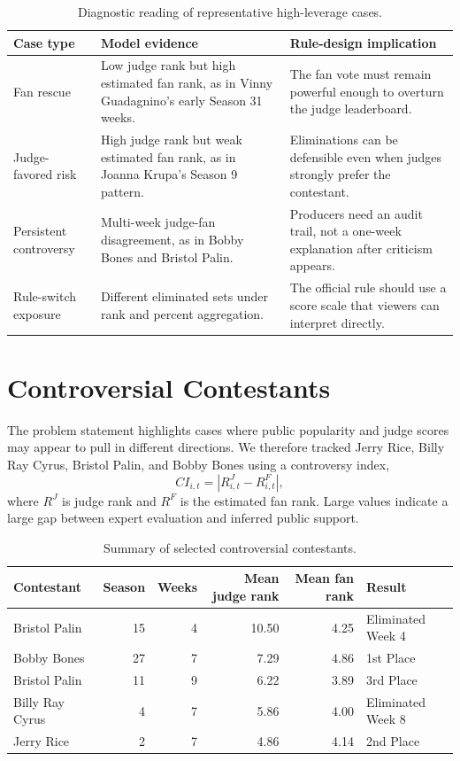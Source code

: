 \documentclass[12pt]{article}
\begin{document}
\begin{table}[!htbp]
  \centering
  \caption{Diagnostic reading of representative high-leverage cases.}
  \label{tab:case-reading}
  \begin{tabularx}{0.96\linewidth}{lXX}
    \toprule
    Case type & Model evidence & Rule-design implication \\
    \midrule
    Fan rescue & Low judge rank but high estimated fan rank, as in Vinny
    Guadagnino's early Season 31 weeks. & The fan vote must remain powerful
    enough to overturn the judge leaderboard. \\
    Judge-favored risk & High judge rank but weak estimated fan rank, as in
    Joanna Krupa's Season 9 pattern. & Eliminations can be defensible even when
    judges strongly prefer the contestant. \\
    Persistent controversy & Multi-week judge-fan disagreement, as in Bobby
    Bones and Bristol Palin. & Producers need an audit trail, not a one-week
    explanation after criticism appears. \\
    Rule-switch exposure & Different eliminated sets under rank and percent
    aggregation. & The official rule should use a score scale that viewers can
    interpret directly. \\
    \bottomrule
  \end{tabularx}
\end{table}

\section{Controversial Contestants}

The problem statement highlights cases where public popularity and judge scores
may appear to pull in different directions. We therefore tracked Jerry Rice,
Billy Ray Cyrus, Bristol Palin, and Bobby Bones using a controversy index,
\[
  CI_{i,t}=|R^J_{i,t}-R^F_{i,t}|,
\]
where $R^J$ is judge rank and $R^F$ is the estimated fan rank. Large values
indicate a large gap between expert evaluation and inferred public support.

\begin{table}[!htbp]
  \centering
  \caption{Summary of selected controversial contestants.}
  \label{tab:controversy}
  \begin{tabular}{lrrrrl}
    \toprule
    Contestant & Season & Weeks & Mean judge rank & Mean fan rank & Result \\
    \midrule
    Bristol Palin & 15 & 4 & 10.50 & 4.25 & Eliminated Week 4 \\
    Bobby Bones & 27 & 7 & 7.29 & 4.86 & 1st Place \\
    Bristol Palin & 11 & 9 & 6.22 & 3.89 & 3rd Place \\
    Billy Ray Cyrus & 4 & 7 & 5.86 & 4.00 & Eliminated Week 8 \\
    Jerry Rice & 2 & 7 & 4.86 & 4.14 & 2nd Place \\
    \bottomrule
  \end{tabular}
\end{table}
\end{document}
